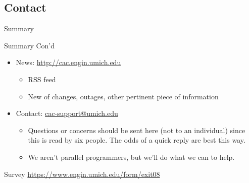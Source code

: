 \documentclass{beamer}
\begin{document}
\subsection{Contact}
\begin{frame}{Summary}
 \begin{block}{Summary Con'd}
 \begin{itemize}
 \item News: \url{http://cac.engin.umich.edu}
   \begin{itemize}
    \item RSS feed
    \item New of changes, outages, other pertinent piece of information
   \end{itemize}
  \item Contact: \url{cac-support@umich.edu}
   \begin{itemize}
    \item Questions or concerns should be sent here (not to an individual) since
this is read by six people.  The odds of a quick reply are best this way.
    \item We aren't parallel programmers, but we'll do what we can to help.
   \end{itemize}
 \end{itemize}
 \end{block}
 \begin{block}{Survey}
    \url{https://www.engin.umich.edu/form/exit08}
 \end{block}
\end{frame}
\end{document}
